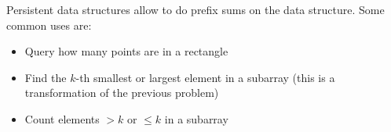 Persistent data structures allow to do prefix sums on the data structure.
Some common uses are: 
\begin{itemize}
  \item Query how many points are in a rectangle
  \item Find the $k$-th smallest or largest element in a subarray (this is a transformation of the previous problem)
  \item Count elements $> k$ or $\le k$ in a subarray
\end{itemize}